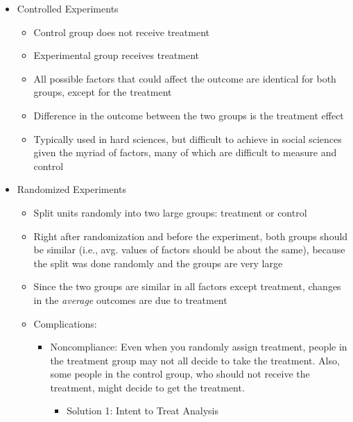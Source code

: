 \documentclass[]{book}
\providecommand{\tightlist}{%
  \setlength{\itemsep}{0pt}\setlength{\parskip}{0pt}}
\begin{document}
\begin{itemize}
\item
  Controlled Experiments

  \begin{itemize}
  \tightlist
  \item
    Control group does not receive treatment
  \item
    Experimental group receives treatment
  \item
    All possible factors that could affect the outcome are identical for both groups, except for the treatment
  \item
    Difference in the outcome between the two groups is the treatment effect
  \item
    Typically used in hard sciences, but difficult to achieve in social sciences given the myriad of factors, many of which are difficult to measure and control
  \end{itemize}
\item
  Randomized Experiments

  \begin{itemize}
  \tightlist
  \item
    Split units randomly into two large groups: treatment or control
  \item
    Right after randomization and before the experiment, both groups should be similar (i.e., avg. values of factors should be about the same), because the split was done randomly and the groups are very large
  \item
    Since the two groups are similar in all factors except treatment, changes in the \emph{average} outcomes are due to treatment
  \item
    Complications:

    \begin{itemize}
    \tightlist
    \item
      Noncompliance: Even when you randomly assign treatment, people in the treatment group may not all decide to take the treatment. Also, some people in the control group, who should not receive the treatment, might decide to get the treatment.

      \begin{itemize}
      \tightlist
      \item
        Solution 1: Intent to Treat Analysis


\end{itemize}
\end{itemize}
\end{itemize}
\end{itemize}
\end{document}
